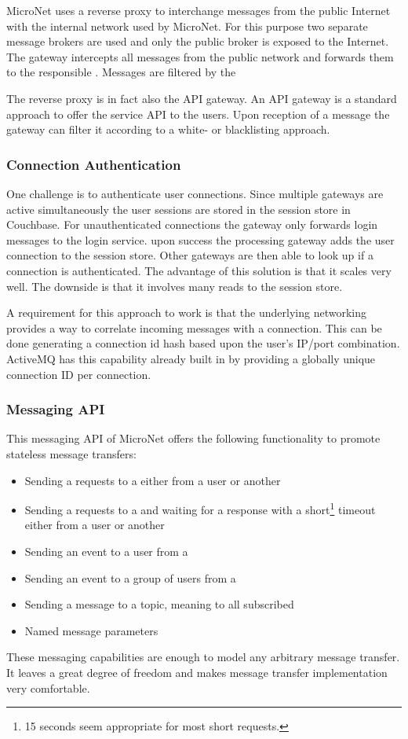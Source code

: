 MicroNet uses a reverse proxy to interchange messages from the public Internet
with the internal network used by MicroNet. For this purpose two separate
message brokers are used and only the public broker is exposed to the Internet.
The gateway intercepts all messages from the public network and forwards them to
the responsible \ms{}. Messages are filtered by the

The reverse proxy is in fact also the API gateway. An API gateway is a standard
approach to offer the service API to the users. Upon reception of a message the
gateway can filter it according to a white- or blacklisting approach.

\subsubsection{Connection Authentication}

One challenge is to authenticate user connections. Since multiple gateways are
active simultaneously the user sessions are stored in the session store in
Couchbase. For unauthenticated connections the gateway only forwards login
messages to the login service. upon success the processing gateway adds the user
connection to the session store. Other gateways are then able to look up if a
connection is authenticated. The advantage of this solution is that it scales
very well. The downside is that it involves many reads to the session store.

A requirement for this approach to work is that the underlying networking
provides a way to correlate incoming messages with a connection. This can be
done generating a connection id hash based upon the user's IP/port combination.
ActiveMQ has this capability already built in by providing a globally unique
connection ID per connection.

\subsubsection{Messaging API}

This messaging API of MicroNet offers the following functionality to promote
stateless message transfers:

\begin{itemize}
  \item Sending a requests to a \ms{} either from a user or another \ms{}
  \item Sending a requests to a \ms{} and waiting for a response with a
  short\footnote{15 seconds seem appropriate for most short requests.} timeout
  either from a user or another \ms{}
  \item Sending an event to a user from a \ms{}
  \item Sending an event to a group of users from a \ms{}
  \item Sending a message to a topic, meaning to all subscribed \mss{}
  \item Named message parameters
\end{itemize}

These messaging capabilities are enough to model any arbitrary message transfer.
It leaves a great degree of freedom and makes message transfer implementation
very comfortable. 